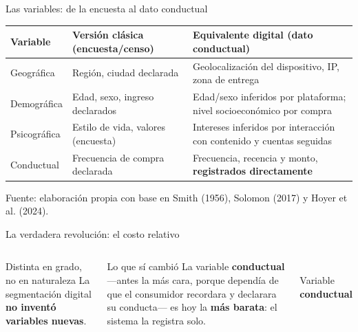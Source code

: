 \documentclass[aspectratio=169,xcolor=dvipsnames]{beamer}
\newcommand{\fuente}[1]{{\tiny\color{IPNgris}Fuente: #1}}
\begin{document}
\begin{frame}{Las variables: de la encuesta al dato conductual}
\small
\begin{center}
\begin{tabular}{@{}>{\raggedright}p{2.3cm}>{\raggedright}p{4.4cm}>{\raggedright\arraybackslash}p{6.2cm}@{}}
\toprule
\textbf{Variable} & \textbf{Versión clásica} (encuesta/censo) & \textbf{Equivalente digital} (dato conductual) \\
\midrule
Geográfica & Región, ciudad declarada & Geolocalización del dispositivo, IP, zona de entrega \\
Demográfica & Edad, sexo, ingreso declarados & Edad/sexo inferidos por plataforma; nivel socioeconómico por compra \\
Psicográfica & Estilo de vida, valores (encuesta) & Intereses inferidos por interacción con contenido y cuentas seguidas \\
Conductual & Frecuencia de compra declarada & Frecuencia, recencia y monto, \textbf{registrados directamente} \\
\bottomrule
\end{tabular}
\end{center}
\fuente{elaboración propia con base en Smith (1956), Solomon (2017) y Hoyer et al. (2024).}
\end{frame}

\begin{frame}{La verdadera revolución: el costo relativo}
\begin{columns}[c]
  \begin{alertblock}{Distinta en grado, no en naturaleza}
    La segmentación digital \textbf{no inventó variables nuevas}.
  \end{alertblock}
  \begin{block}{Lo que sí cambió}
    La variable \textbf{conductual} —antes la más cara, porque dependía de que el consumidor recordara y declarara su conducta— es hoy la \textbf{más barata}: el sistema la registra solo.
  \end{block}
  \centering
  \\[2pt]
  {\scriptsize Variable \textbf{conductual}}
\end{columns}
\end{frame}
\end{document}
